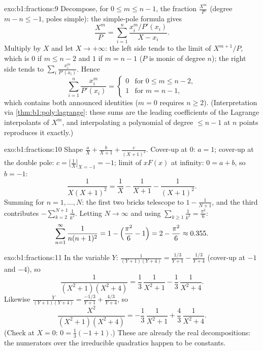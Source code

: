 \begin{solution}{exo:b1:fractions:9}
Decompose, for $0 \leq m \leq n - 1$, the fraction $\frac{X^m}{P}$
(degree $m - n \leq -1$, poles simple): the simple-pole formula gives
\[
\frac{X^m}{P} = \sum_{i=1}^{n} \frac{x_i^m / P'(x_i)}{X - x_i} .
\]
Multiply by $X$ and let $X \to +\infty$: the left side tends to the
limit of $X^{m+1}/P$, which is $0$ if $m \leq n - 2$ and $1$ if $m =
n - 1$ ($P$ is monic of degree $n$); the right side tends to
$\sum_i \frac{x_i^m}{P'(x_i)}$. Hence
\[
\sum_{i=1}^{n} \frac{x_i^{m}}{P'(x_i)} =
\begin{cases}
0 & \text{for } 0 \leq m \leq n-2,\\
1 & \text{for } m = n - 1,
\end{cases}
\]
which contains both announced identities ($m = 0$ requires $n \geq
2$). (Interpretation via \cref{thm:b1:poly:lagrange}: these sums are
the leading coefficients of the Lagrange interpolants of $X^m$, and
interpolating a polynomial of degree $\leq n-1$ at $n$ points
reproduces it exactly.)
\end{solution}

\begin{solution}{exo:b1:fractions:10}
Shape $\frac aX + \frac b{X+1} + \frac c{(X+1)^2}$. Cover-up at
$0$: $a = 1$; cover-up at the double pole: $c = \bigl[\frac1X
\bigr]_{X=-1} = -1$; limit of $xF(x)$ at infinity: $0 = a + b$, so
$b = -1$:
\[
\frac{1}{X(X+1)^2} = \frac1X - \frac1{X+1} - \frac1{(X+1)^2} .
\]
Summing for $n = 1, \dots, N$: the first two bricks telescope to
$1 - \frac1{N+1}$, and the third contributes $-\sum_{k=2}^{N+1}
\frac1{k^2}$. Letting $N \to \infty$ and using $\sum_{k\geq1}
\frac1{k^2} = \frac{\pi^2}6$:
\[
\sum_{n=1}^{\infty}\frac{1}{n(n+1)^2}
= 1 - \Bigl(\frac{\pi^2}6 - 1\Bigr) = 2 - \frac{\pi^2}6
\approx 0.355 .
\]
\end{solution}

\begin{solution}{exo:b1:fractions:11}
In the variable $Y$: $\frac1{(Y+1)(Y+4)} = \frac{1/3}{Y+1} -
\frac{1/3}{Y+4}$ (cover-up at $-1$ and $-4$), so
\[
\frac{1}{(X^2+1)(X^2+4)}
= \frac13\,\frac1{X^2+1} - \frac13\,\frac1{X^2+4} .
\]
Likewise $\frac{Y}{(Y+1)(Y+4)} = \frac{-1/3}{Y+1} +
\frac{4/3}{Y+4}$, so
\[
\frac{X^2}{(X^2+1)(X^2+4)}
= -\frac13\,\frac1{X^2+1} + \frac43\,\frac1{X^2+4} .
\]
(Check at $X = 0$: $0 = \frac13(-1 + 1)$.) These are already the
real decompositions: the numerators over the irreducible quadratics
happen to be constants.
\end{solution}

